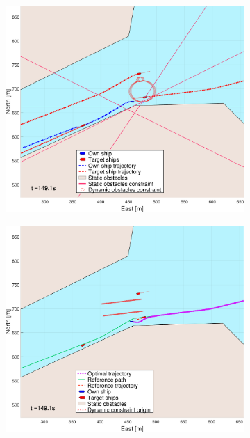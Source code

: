 \begin{figure}[!ht]
\begin{subfigure}[b]{0.494\textwidth}
        \subcaption{}
    \end{subfigure}
    \hfill
    \\
    \begin{subfigure}[b]{0.494\textwidth}
        \centering
        \includegraphics[width=\textwidth]{Images/NewFigures/Trheimfjord/_Simple_1fig1_time=150}
        \subcaption{}
    \end{subfigure}
    \hfill
    \begin{subfigure}[b]{0.494\textwidth}
        \centering
        \includegraphics[width=\textwidth]{Images/NewFigures/Trheimfjord/_Simple_1fig999_time=150}

\end{subfigure}
\end{figure}

